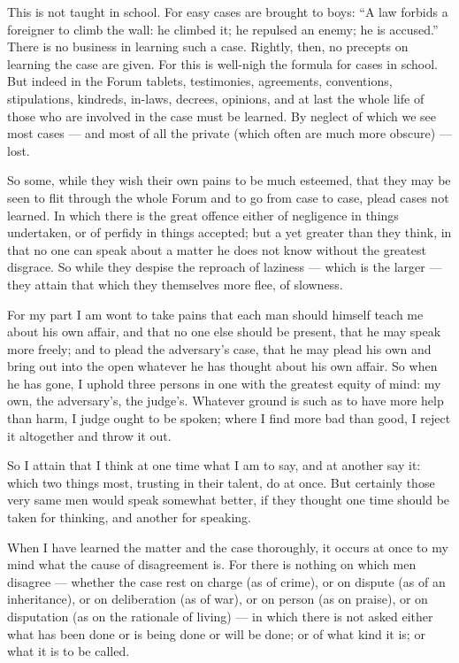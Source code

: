  This is not taught in school. For easy cases are brought to boys: ``A law forbids a foreigner to climb the wall: he climbed it; he repulsed an enemy; he is accused.'' There is no business in learning such a case. Rightly, then, no precepts on learning the case are given. For this is well-nigh the formula for cases in school. But indeed in the Forum tablets, testimonies, agreements, conventions, stipulations, kindreds, in-laws, decrees, opinions, and at last the whole life of those who are involved in the case must be learned. By neglect of which we see most cases — and most of all the private (which often are much more obscure) — lost.

 So some, while they wish their own pains to be much esteemed, that they may be seen to flit through the whole Forum and to go from case to case, plead cases not learned. In which there is the great offence either of negligence in things undertaken, or of perfidy in things accepted; but a yet greater than they think, in that no one can speak about a matter he does not know without the greatest disgrace. So while they despise the reproach of laziness — which is the larger — they attain that which they themselves more flee, of slowness.

 For my part I am wont to take pains that each man should himself teach me about his own affair, and that no one else should be present, that he may speak more freely; and to plead the adversary's case, that he may plead his own and bring out into the open whatever he has thought about his own affair. So when he has gone, I uphold three persons in one with the greatest equity of mind: my own, the adversary's, the judge's. Whatever ground is such as to have more help than harm, I judge ought to be spoken; where I find more bad than good, I reject it altogether and throw it out.

 So I attain that I think at one time what I am to say, and at another say it: which two things most, trusting in their talent, do at once. But certainly those very same men would speak somewhat better, if they thought one time should be taken for thinking, and another for speaking.

 When I have learned the matter and the case thoroughly, it occurs at once to my mind what the cause of disagreement is. For there is nothing on which men disagree — whether the case rest on charge (as of crime), or on dispute (as of an inheritance), or on deliberation (as of war), or on person (as on praise), or on disputation (as on the rationale of living) — in which there is not asked either what has been done or is being done or will be done; or of what kind it is; or what it is to be called.

